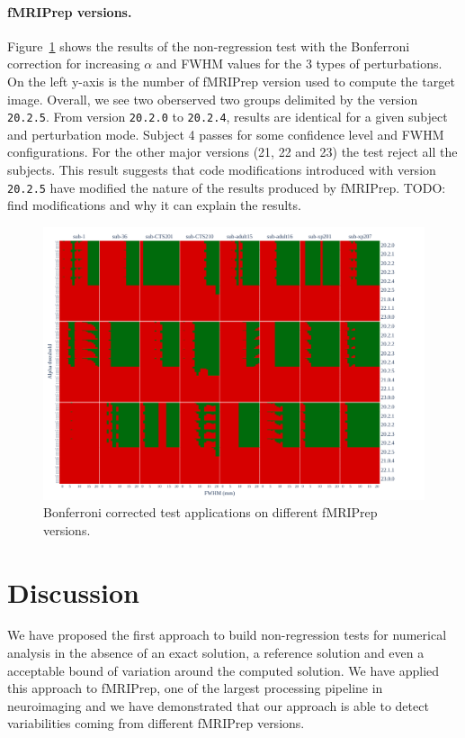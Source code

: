 \documentclass{article}
\newcommand{\TODO}[1]{\color{red}\textsc{TODO:} #1\color{black}\xspace}
\newcommand{\fmriprep}{fMRIPrep\xspace}
\begin{document}
\paragraph*{\fmriprep versions.} Figure~\ref{fig:version_bonferroni} shows the results of the non-regression test
with the Bonferroni correction for increasing $\alpha$ and FWHM values for the 3 types of perturbations.
On the left y-axis is the number of \fmriprep version used to compute the target image.
Overall, we see two oberserved two groups delimited by the version \texttt{20.2.5}.
From version \texttt{20.2.0} to \texttt{20.2.4}, results are identical for a given subject and perturbation mode.
Subject 4 passes for some confidence level and FWHM configurations. For the other major versions (21, 22 and 23)
the test reject all the subjects. This result suggests that code modifications introduced with version \texttt{20.2.5}
have modified the nature of the results produced by \fmriprep.
\TODO{find modifications and why it can explain the results}.

\begin{figure}
    \centering
    \includegraphics[width=\linewidth]{figures/fmriprep-versions/bonferroni.pdf}
    \caption{Bonferroni corrected test applications on different \fmriprep versions.}
    \label{fig:version_bonferroni}
\end{figure}


\section{Discussion}

We have proposed the first approach to build non-regression tests for numerical
analysis in the absence of an exact solution, a reference solution and even a
acceptable bound of variation around the computed solution. We have applied this
approach to \fmriprep, one of the largest processing pipeline in neuroimaging
and we have demonstrated that our approach is able to detect variabilities
coming from different \fmriprep versions.
\end{document}
